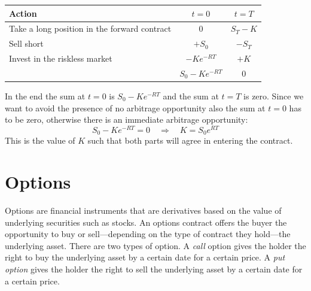 \begin{center}
    \begin{tabular}{lcc}\toprule
        Action & $t=0$ & $t=T$ \\\midrule
        Take a long position in the forward contract &  0 & $S_T-K$ \\
        Sell short & $+S_0$ & $-S_T$ \\
        Invest in the riskless market & $-Ke^{-RT}$ & $+K$ \\ \midrule\midrule
         & $S_0-Ke^{-RT}$ & $0$ \\\bottomrule
    \end{tabular}
\end{center}
In the end the sum at $t=0$ is $S_0-Ke^{-RT}$ and the sum at $t=T$ is zero. Since we want to avoid the presence of no arbitrage opportunity also the sum at $t=0$ has to be zero, otherwise there is an immediate arbitrage opportunity:
\begin{equation}
    S_0-Ke^{-RT} = 0 \quad\Rightarrow\quad K = S_0e^{RT}
\end{equation}
This is the value of $K$ such that both parts will agree in entering the contract.

\section{Options}
Options are financial instruments that are derivatives based on the value of underlying securities such as stocks. An options contract offers the buyer the opportunity to buy or sell—depending on the type of contract they hold—the underlying asset. There are two types of option. A \emph{call} option gives the holder the right to buy the underlying asset by a certain date for a certain price. A \emph{put option} gives the holder the right to sell the underlying asset by a certain date for a certain price.

